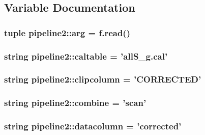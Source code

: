 \subsection{\-Variable \-Documentation}
\hypertarget{namespacepipeline2_af38c12281c772d37cb9a08a6fbbe0245}{
\subsubsection[{arg}]{\setlength{\rightskip}{0pt plus 5cm}tuple {\bf pipeline2\-::arg} = f.\-read()}}\label{namespacepipeline2_af38c12281c772d37cb9a08a6fbbe0245}
\hypertarget{namespacepipeline2_a2a62d898dc748d69f71f3a996be4d11d}{
\subsubsection[{caltable}]{\setlength{\rightskip}{0pt plus 5cm}string {\bf pipeline2\-::caltable} = 'all\-S\-\_\-g.\-cal'}}\label{namespacepipeline2_a2a62d898dc748d69f71f3a996be4d11d}
\hypertarget{namespacepipeline2_aed76e7c47bf36e722f0f7caf34838a53}{
\subsubsection[{clipcolumn}]{\setlength{\rightskip}{0pt plus 5cm}string {\bf pipeline2\-::clipcolumn} = '\-C\-O\-R\-R\-E\-C\-T\-E\-D'}}\label{namespacepipeline2_aed76e7c47bf36e722f0f7caf34838a53}
\hypertarget{namespacepipeline2_a1b65be692b8ea61e4a3fe7631be543c0}{
\subsubsection[{combine}]{\setlength{\rightskip}{0pt plus 5cm}string {\bf pipeline2\-::combine} = 'scan'}}\label{namespacepipeline2_a1b65be692b8ea61e4a3fe7631be543c0}
\hypertarget{namespacepipeline2_a6db2705d3f51006c94b13097481c505f}{
\subsubsection[{datacolumn}]{\setlength{\rightskip}{0pt plus 5cm}string {\bf pipeline2\-::datacolumn} = 'corrected'}}\label{namespacepipeline2_a6db2705d3f51006c94b13097481c505f}
